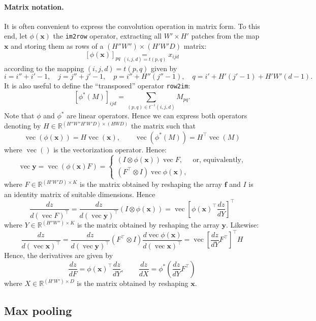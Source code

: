 \documentclass[12pt]{article}
\newcommand{\real}{\mathbb{R}}
\newcommand{\vv}{\operatorname{vec}}
\newcommand{\bx}{\mathbf{x}}
\newcommand{\by}{\mathbf{y}}
\newcommand{\bff}{\mathbf{f}}
\begin{document}
\paragraph{Matrix notation.} It is often convenient to express the convolution operation in matrix form. To this end, let $\phi(\bx)$ the {\tt im2row} operator, extracting all $W' \times H'$ patches from the map $\bx$ and storing them as rows of a $(H''W'') \times (H'W'D)$ matrix:
\[
   [\phi(\bx)]_{pq} \underset{(i,j,d)=t(p,q)}{=} x_{ijd}
\]
according to the mapping $(i,j,d) = t(p,q)$ given by
\[
 i = i''+i'-1, \quad
 j = j''+j'-1, \quad
 p = i'' + H'' (j''-1), \quad
 q = i' + H'(j'-1) + H'W' (d-1).
\]
It is also useful to define the ``transposed'' operator {\tt row2im}:
\[
   [\phi^*(M)]_{ijd}
   =
   \sum_{(p,q) \in t^{-1}(i,j,d)}
   M_{pq}.
\]
Note that $\phi$ and $\phi^*$ are linear operators. Hence we can express both operators denoting by $H\in\real^{(H''W''H'W'D) \times(HWD)}$ the matrix such that
\[
  \vv(\phi(\bx)) = H \vv(\bx), \qquad 
  \vv(\phi^*(M)) = H^\top \vv(M)
\]
where $\vv()$ is the vectorization operator. Hence:
\[
 \vv\by = 
 \vv\left(\phi(\bx) F\right)
 =
 \begin{cases}
 (I \otimes \phi(\bx)) \vv F, & \text{or, equivalently,} \\
 (F^\top \otimes I) \vv \phi(\bx),
 \end{cases}
\]
where $F\in\mathbb{R}^{(H'W'D)\times K}$ is the matrix obtained by reshaping the array $\bff$ and $I$ is an identity matrix of suitable dimensions. Hence
\[
\frac{dz}{d(\vv F)^\top}
=
\frac{dz}{d(\vv\by)^\top}
(I \otimes \phi(\bx))
= \vv\left[ 
\phi(\bx)^\top 
\frac{dz}{dY}
\right]^\top
\]
where $Y\in\real^{(H''W'')\times K}$ is the matrix obtained by reshaping the array $\by$. Likewise:
\[
\frac{dz}{d(\vv \bx)^\top}
=
\frac{dz}{d(\vv\by)^\top}
(F^\top \otimes I)
\frac{d\vv \phi(\bx)}{d(\vv \bx)^\top}
=
\vv\left[ 
\frac{dz}{dY}
F^\top
\right]^\top
H
\]
Hence, the derivatives are given by
\[
\boxed{
\frac{dz}{dF}
=
\phi(\bx)^\top\frac{d z}{d Y},
\qquad
\frac{d z}{d X}
=
\phi^*\left(
\frac{d z}{d Y}F^\top
\right)
}
\]
where $X\in\real^{(H'W')\times D}$ is the matrix obtained by reshaping $\bx$.

\subsection{Max pooling}\label{s:pooling}
\end{document}
